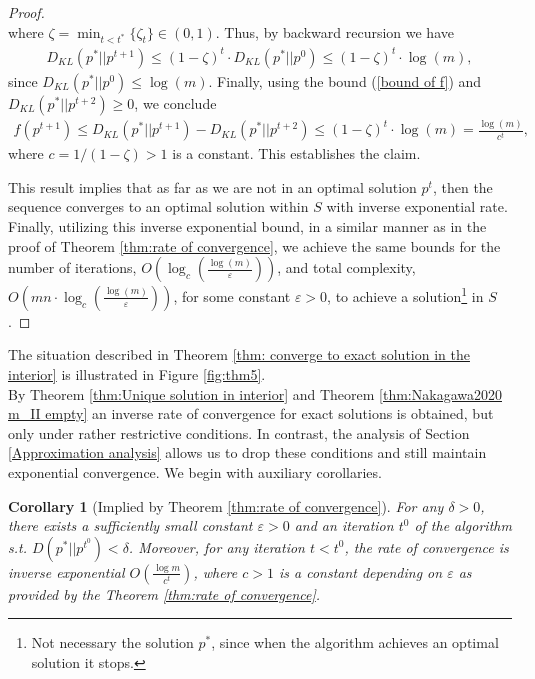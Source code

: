 \documentclass[11pt, letterpaper]{article}
\newtheorem{corollary}{Corollary}
\begin{document}
\begin{proof}
\begin{equation*}
\end{equation*}
where $\zeta = \min_{t < t^*} \{\zeta_t\} \in (0,  1)$. Thus, by backward recursion we have
\begin{equation*}
\begin{split}
    D_{KL}(p^* || p^{t+1}) \leq (1-\zeta)^t \cdot D_{KL}(p^* || p^{0}) \leq (1-\zeta)^t \cdot \log (m),  
\end{split}
\end{equation*}
since $D_{KL}(p^*||p^{0}) \leq \log (m)$.
Finally, using the bound (\ref{bound of f}) and $D_{KL}(p^* || p^{t+2}) \geq 0$, we conclude
\begin{equation*}
\begin{split}
    f(p^{t+1}) \leq D_{KL}(p^* || p^{t+1}) -D_{KL}(p^* || p^{t+2}) \leq (1-\zeta)^t \cdot \log (m)=\frac{\log(m)}{c^t},  
\end{split}
\end{equation*}
where $c = 1/(1-\zeta) > 1$ is a constant. This establishes the claim.

This result implies that as far as we are not in an optimal solution $p^t$, then the sequence converges to an optimal solution within $S$ with inverse exponential rate. Finally, utilizing this inverse exponential bound, in a similar manner as in the proof of Theorem \ref{thm:rate of convergence},
we achieve the same bounds for the number of iterations, $O\left(\log_c \left(\frac{\log(m)}{\varepsilon}\right)\right)$, and total complexity, $O\left(m n \cdot \log_c \left(\frac{\log(m)}{\varepsilon}\right)\right)$, for some constant $\varepsilon>0$, to achieve a solution\footnote{Not necessary the solution $p^*$, since when the algorithm achieves an optimal solution it stops.} in $S$.
\end{proof}


\noindent The situation described in Theorem \ref{thm: converge to exact solution in the interior} is illustrated in Figure \ref{fig:thm5}.\\ 

By Theorem \ref{thm:Unique solution in interior} and Theorem \ref{thm:Nakagawa2020 m_II empty} an inverse rate of convergence for exact solutions is obtained, but only under rather restrictive conditions.
In contrast, the analysis of Section \ref{Approximation analysis} allows us to drop these conditions and still maintain exponential convergence. We begin with auxiliary corollaries.\\

\begin{corollary}[Implied by Theorem \ref{thm:rate of convergence}]
\label{Corollary:3}
For any $\delta>0$, there exists a sufficiently small constant $\varepsilon > 0$ and an iteration $t^0$ of the algorithm s.t. $D\left(p^* || p^{t^0}\right) < \delta$. Moreover, for any iteration $t < t^0$, the rate of convergence is inverse exponential $O\left(\frac{\log m}{c^t}\right)$, where $c > 1$ is a constant depending on $\varepsilon$ as provided by the Theorem \ref{thm:rate of convergence}.\\
\end{corollary}
\end{document}
